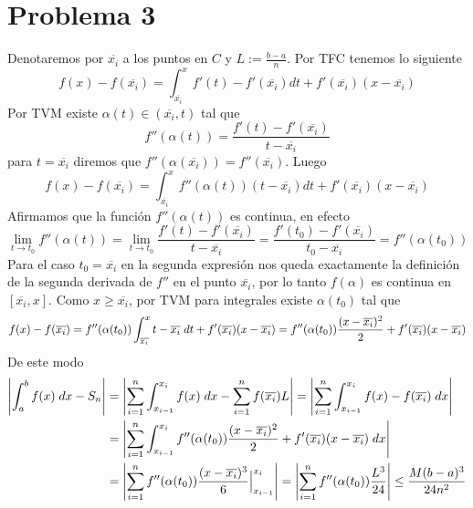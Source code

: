 \documentclass{article}
\begin{document}
\section*{Problema 3}
\noindent Denotaremos por $\overline{x_{i}}$ a los puntos en $C$ y $L:=\frac{b-a}{n}$. Por TFC 
tenemos lo siguiente
\begin{equation*}
    f(x)-f(\overline{x_{i}})=\int_{\overline{x_{i}}}^{x}f'(t)-f'(\overline{x_{i}})dt+
    f'(\overline{x_{i}})(x-\overline{x_{i}})
\end{equation*}
Por TVM existe $\alpha(t)\in(\overline{x_{i}},t)$ tal que
\begin{equation*}
    f''(\alpha(t))=\frac{f'(t)-f'(\overline{x_{i}})}{t-\overline{x_{i}}}
\end{equation*}
para $t=\overline{x_{i}}$ diremos que $f''(\alpha(\overline{x_{i}}))=f''(\overline{x_{i}})$. Luego
\begin{equation*}
    f(x)-f(\overline{x_{i}})=\int_{\overline{x_{i}}}^{x}f''(\alpha(t))(t-\overline{x_{i}})dt+
    f'(\overline{x_{i}})(x-\overline{x_{i}})
\end{equation*}
Afirmamos que la función $f''(\alpha(t))$ es continua, en efecto
\begin{equation*}
    \lim_{t\to t_{0}}f''(\alpha(t))=\lim_{t\to t_{0}}\frac{f'(t)-f'(\overline{x_{i}})}
    {t-\overline{x_{i}}}=\frac{f'(t_{0})-f'(\overline{x_{i}})}
    {t_{0}-\overline{x_{i}}}=f''(\alpha(t_{0}))
\end{equation*}
Para el caso $t_{0}=\overline{x_{i}}$ en la segunda expresión nos queda exactamente la definición 
de la segunda derivada de $f''$ en el punto $\overline{x_{i}}$, por lo tanto $f(\alpha)$ es 
continua en $[\overline{x_{i}},x]$. Como $x\geq\overline{x_{i}}$, por TVM para integrales existe 
$\alpha(t_{0})$ tal que
\begin{equation*}
    f(x)-f(\overline{x_{i}})=f''(\alpha(t_{0}))\int_{\overline{x_{i}}}^{x}t-\overline{x_{i}}
    \hspace{1mm}dt+f'(\overline{x_{i}})(x-\overline{x_{i}})=f''(\alpha(t_{0}))
    \frac{(x-\overline{x_{i}})^{2}}{2}+f'(\overline{x_{i}})(x-\overline{x_{i}})
\end{equation*}
De este modo
\begin{align*}
    \left|\int_{a}^{b}f(x)\hspace{1mm}dx-S_{n} \right| &= \left|\sum_{i=1}^{n}\int_{x_{i-1}}^{x_{i}}f(x)
    \hspace{1mm}dx-\sum_{i=1}^{n}f(\overline{x_{i}})L \right|=\left|\sum_{i=1}^{n}\int_{x_{i-1}}^{x_{i}}
    f(x)-f(\overline{x_{i}})\hspace{1mm}dx \right| \\
    &= \left|\sum_{i=1}^{n}\int_{x_{i-1}}^{x_{i}}f''(\alpha(t_{0}))\frac{(x-\overline{x_{i}})^{2}}
    {2}+f'(\overline{x_{i}})(x-\overline{x_{i}})\hspace{1mm}dx \right| \\
    &= \left|\sum_{i=1}^{n}f''(\alpha(t_{0}))\frac{(x-\overline{x_{i}})^{3}}{6}
    \Big|_{x_{i-1}}^{x_{i}} \right|=\left|\sum_{i=1}^{n}f''(\alpha(t_{0}))\frac{L^{3}}{24} \right|\leq
    \frac{M(b-a)^{3}}{24n^{2}}
\end{align*}
\end{document}
